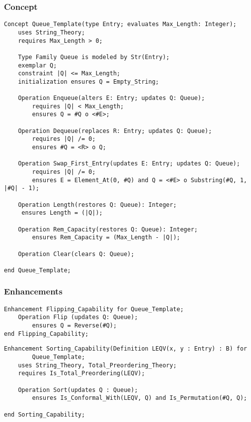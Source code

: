		\subsubsection{Concept}	%

\begin{lstlisting}[language=resolve]
Concept Queue_Template(type Entry; evaluates Max_Length: Integer);
    uses String_Theory;
    requires Max_Length > 0;
 
    Type Family Queue is modeled by Str(Entry);
    exemplar Q;
    constraint |Q| <= Max_Length;
    initialization ensures Q = Empty_String;
 
    Operation Enqueue(alters E: Entry; updates Q: Queue);
        requires |Q| < Max_Length;
        ensures Q = #Q o <#E>;
 
    Operation Dequeue(replaces R: Entry; updates Q: Queue);
        requires |Q| /= 0;
        ensures #Q = <R> o Q;

    Operation Swap_First_Entry(updates E: Entry; updates Q: Queue);
        requires |Q| /= 0;
        ensures E = Element_At(0, #Q) and Q = <#E> o Substring(#Q, 1, |#Q| - 1);

    Operation Length(restores Q: Queue): Integer;
     ensures Length = (|Q|);
 
    Operation Rem_Capacity(restores Q: Queue): Integer;
        ensures Rem_Capacity = (Max_Length - |Q|);
 
    Operation Clear(clears Q: Queue);
 
end Queue_Template;
\end{lstlisting}

		\subsubsection{Enhancements}	%

\begin{lstlisting}[language=resolve]
Enhancement Flipping_Capability for Queue_Template;
    Operation Flip (updates Q: Queue);
        ensures Q = Reverse(#Q);
end Flipping_Capability;
\end{lstlisting}

\begin{lstlisting}[language=resolve]
Enhancement Sorting_Capability(Definition LEQV(x, y : Entry) : B) for 
		Queue_Template;
	uses String_Theory, Total_Preordering_Theory;
	requires Is_Total_Preordering(LEQV);

	Operation Sort(updates Q : Queue);
		ensures Is_Conformal_With(LEQV, Q) and Is_Permutation(#Q, Q);

end Sorting_Capability;
\end{lstlisting}

